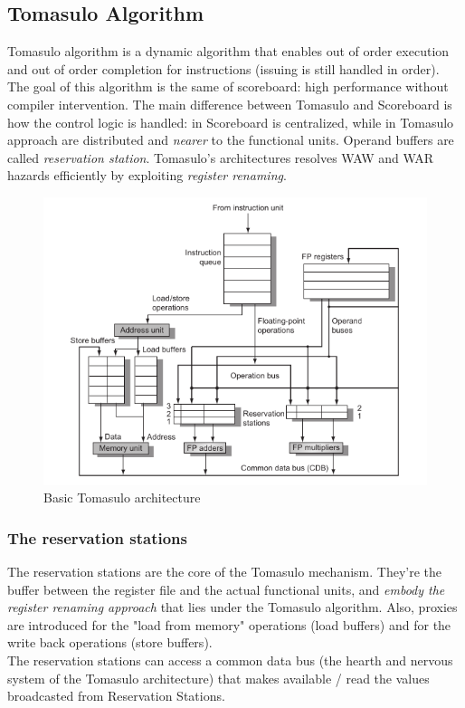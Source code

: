 \documentclass[10pt,a4paper]{article}
\begin{document}
			\subsection{Tomasulo Algorithm}
				Tomasulo algorithm is a dynamic algorithm that enables out of order execution and out of order completion for instructions (issuing is still handled in order). The goal of this algorithm is the same of scoreboard: high performance without compiler intervention. The main difference between Tomasulo and Scoreboard is how the control logic is handled: in Scoreboard is centralized, while in Tomasulo approach are distributed and \emph{nearer} to the functional units. Operand buffers are called \emph{reservation station}. Tomasulo's architectures resolves WAW and WAR hazards efficiently by exploiting \emph{register renaming}.
				\begin{figure}[H]
					\centering
					\includegraphics[width = \textwidth]{./images/TomasuloArchitecture.png}
					\caption{Basic Tomasulo architecture}
				\end{figure}
				
				\subsubsection{The reservation stations}
					The reservation stations are the core of the Tomasulo mechanism. They're the buffer between the register file and the actual functional units, and \emph{embody the register renaming approach} that lies under the Tomasulo algorithm. Also, proxies are introduced for the "load from memory" operations (load buffers) and for the write back operations (store buffers).\\
					The reservation stations can access a common data bus (the hearth and nervous system of the Tomasulo architecture) that makes available / read the values broadcasted from Reservation Stations.
					
\end{document}
